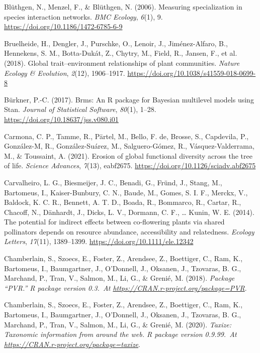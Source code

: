 \documentclass[
  12pt,
  a4paper,
]{article}
\newlength{\cslhangindent}
\newlength{\cslentryspacingunit} %
\newenvironment{CSLReferences}[2] %
 {%
  \setlength{\parindent}{0pt}
  \ifodd #1
  \let\oldpar\par
  \def\par{\hangindent=\cslhangindent\oldpar}
  \fi
  \setlength{\parskip}{#2\cslentryspacingunit}
 }%
 {}
\begin{document}
\begin{CSLReferences}{1}{0}
\leavevmode{}%
Blüthgen, N., Menzel, F., \& Blüthgen, N. (2006). Measuring specialization in species interaction networks. \emph{BMC Ecology}, \emph{6}(1), 9. \url{https://doi.org/10.1186/1472-6785-6-9}

\leavevmode{}%
Bruelheide, H., Dengler, J., Purschke, O., Lenoir, J., Jiménez-Alfaro, B., Hennekens, S. M., Botta-Dukát, Z., Chytry, M., Field, R., Jansen, F., et al. (2018). Global trait--environment relationships of plant communities. \emph{Nature Ecology \& Evolution}, \emph{2}(12), 1906--1917. \url{https://doi.org/10.1038/s41559-018-0699-8}

\leavevmode{}%
Bürkner, P.-C. (2017). Brms: {An R} package for {Bayesian} multilevel models using {Stan}. \emph{Journal of Statistical Software}, \emph{80}(1), 1--28. \url{https://doi.org/10.18637/jss.v080.i01}

\leavevmode{}%
Carmona, C. P., Tamme, R., Pärtel, M., Bello, F. de, Brosse, S., Capdevila, P., González-M, R., González-Suárez, M., Salguero-Gómez, R., Vásquez-Valderrama, M., \& Toussaint, A. (2021). Erosion of global functional diversity across the tree of life. \emph{Science Advances}, \emph{7}(13), eabf2675. \url{https://doi.org/10.1126/sciadv.abf2675}

\leavevmode{}%
Carvalheiro, L. G., Biesmeijer, J. C., Benadi, G., Fründ, J., Stang, M., Bartomeus, I., Kaiser-Bunbury, C. N., Baude, M., Gomes, S. I. F., Merckx, V., Baldock, K. C. R., Bennett, A. T. D., Boada, R., Bommarco, R., Cartar, R., Chacoff, N., Dänhardt, J., Dicks, L. V., Dormann, C. F., \ldots{} Kunin, W. E. (2014). The potential for indirect effects between co-flowering plants via shared pollinators depends on resource abundance, accessibility and relatedness. \emph{Ecology Letters}, \emph{17}(11), 1389--1399. \url{https://doi.org/10.1111/ele.12342}

\leavevmode{}%
Chamberlain, S., Szoecs, E., Foster, Z., Arendsee, Z., Boettiger, C., Ram, K., Bartomeus, I., Baumgartner, J., O'Donnell, J., Oksanen, J., Tzovaras, B. G., Marchand, P., Tran, V., Salmon, M., Li, G., \& Grenié, M. (2018). \emph{Package {``{PVR}.''} R package version 0.3.~At \href{https://CRAN.R-project.org/package=PVR}{https://CRAN.r-project.org/package=PVR}}.

\leavevmode{}%
Chamberlain, S., Szoecs, E., Foster, Z., Arendsee, Z., Boettiger, C., Ram, K., Bartomeus, I., Baumgartner, J., O'Donnell, J., Oksanen, J., Tzovaras, B. G., Marchand, P., Tran, V., Salmon, M., Li, G., \& Grenié, M. (2020). \emph{Taxize: {Taxonomic} information from around the web. R package version 0.9.99.~At \href{https://CRAN.R-project.org/package=taxize}{https://CRAN.r-project.org/package=taxize}}.


\end{CSLReferences}
\end{document}
